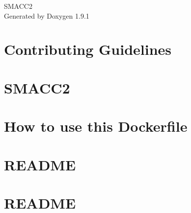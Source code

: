\let\mypdfximage\pdfximage\def\pdfximage{\immediate\mypdfximage}\documentclass[twoside]{book}
\newcommand{\+}{\discretionary{\mbox{\scriptsize$\hookleftarrow$}}{}{}}
\newcommand{\clearemptydoublepage}{%
  \newpage{\pagestyle{empty}\cleardoublepage}%
}
\begin{document}
\raggedbottom

\hypersetup{pageanchor=false,
             bookmarksnumbered=true,
             pdfencoding=unicode
            }
\begin{titlepage}
\vspace*{7cm}
\begin{center}%
{\Large SMACC2 }\\
\vspace*{1cm}
{\large Generated by Doxygen 1.9.1}\\
\end{center}
\end{titlepage}
\clearemptydoublepage
{}
\tableofcontents
\clearemptydoublepage
{}
\hypersetup{pageanchor=true}

\chapter{Contributing Guidelines}
\label{md_CONTRIBUTING}

\chapter{SMACC2}
\label{md_README}

\chapter{How to use this Dockerfile}
\label{md_smacc2_ci_docker_ros_rollingAndGalactic_ubuntu_20_04_README}

\chapter{README}
\label{md_smacc2_performance_tools__smacc2_sm_template_README}

\chapter{README}
\label{md_smacc2_performance_tools_performance_tests_sm_atomic_performance_trace_1_README}

\end{document}
